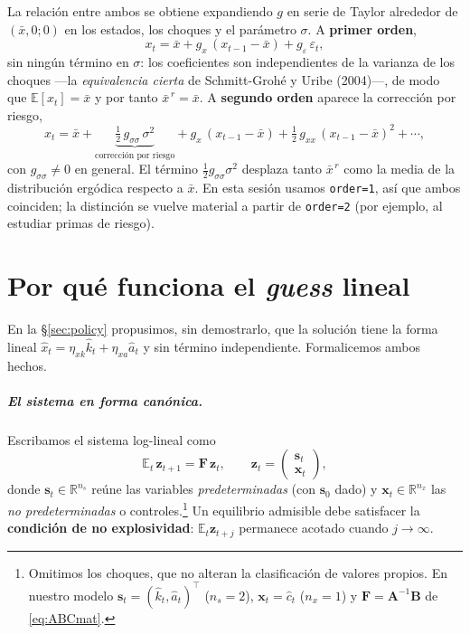 \documentclass[11pt,a4paper]{report}
\newcounter{tcbrem}[section]
\renewcommand{\thetcbrem}{\thesection.\arabic{tcbrem}}
\newenvironment{remark}{%
  \refstepcounter{tcbrem}%
  \begin{tcolorbox}[remarkstyle, title={Observación~\thetcbrem}]}%
{\end{tcolorbox}}
\newcommand{\code}[1]{\texttt{#1}}
\newcommand{\Real}{\mathbb{R}}
\newcommand{\E}{\mathbb{E}}
\begin{document}
\begin{remark}
La relación entre ambos se obtiene expandiendo $g$ en serie de Taylor alrededor
de $(\bar{x},0;0)$ en los estados, los choques y el parámetro $\sigma$. A
\textbf{primer orden},
\[
x_t=\bar{x}+g_x\,(x_{t-1}-\bar{x})+g_\varepsilon\,\varepsilon_t,
\]
sin ningún término en $\sigma$: los coeficientes son independientes de la
varianza de los choques ---la \emph{equivalencia cierta} de Schmitt-Grohé y
Uribe (2004)---, de modo que $\E[x_t]=\bar{x}$ y por tanto
$\bar{x}^{\,r}=\bar{x}$. A \textbf{segundo orden} aparece la corrección por
riesgo,
\[
x_t=\bar{x}+\underbrace{\tfrac12\,g_{\sigma\sigma}\,\sigma^2}_{\text{corrección por riesgo}}
+g_x\,(x_{t-1}-\bar{x})+\tfrac12\,g_{xx}\,(x_{t-1}-\bar{x})^{2}+\cdots,
\]
con $g_{\sigma\sigma}\neq 0$ en general. El término
$\tfrac12 g_{\sigma\sigma}\sigma^2$ desplaza tanto $\bar{x}^{\,r}$ como la media
de la distribución ergódica respecto a $\bar{x}$. En esta sesión usamos
\code{order=1}, así que ambos coinciden; la distinción se vuelve material a
partir de \code{order=2} (por ejemplo, al estudiar primas de riesgo).
\end{remark}

\chapter{Por qué funciona el \emph{guess} lineal}
\label{app:undetermined}

En la \S\ref{sec:policy} propusimos, sin demostrarlo, que la solución tiene la
forma lineal $\hat{x}_t=\eta_{xk}\hat{k}_t+\eta_{xa}\hat{a}_t$ y sin término
independiente. Formalicemos ambos hechos.

\paragraph{El sistema en forma canónica.} Escribamos el sistema log-lineal como
\begin{equation}
\E_t\,\mathbf{z}_{t+1}=\mathbf{F}\,\mathbf{z}_t,\qquad
\mathbf{z}_t=\begin{pmatrix}\mathbf{s}_t\\[1pt]\mathbf{x}_t\end{pmatrix}, \label{eq:canon}
\end{equation}
donde $\mathbf{s}_t\in\Real^{n_s}$ reúne las variables \emph{predeterminadas}
(con $\mathbf{s}_0$ dado) y $\mathbf{x}_t\in\Real^{n_x}$ las \emph{no
predeterminadas} o controles.\footnote{Omitimos los choques, que no alteran la
clasificación de valores propios. En nuestro modelo
$\mathbf{s}_t=(\hat{k}_t,\hat{a}_t)^{\!\top}$ ($n_s=2$),
$\mathbf{x}_t=\hat{c}_t$ ($n_x=1$) y $\mathbf{F}=\mathbf{A}^{-1}\mathbf{B}$ de
\eqref{eq:ABCmat}.} Un equilibrio admisible debe satisfacer la \textbf{condición
de no explosividad}: $\E_t\mathbf{z}_{t+j}$ permanece acotado cuando
$j\to\infty$.
\end{document}
